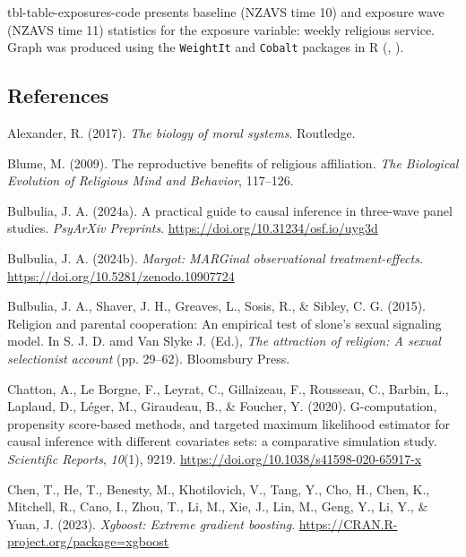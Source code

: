 \documentclass[
  single column]{article}
\newlength{\cslhangindent}
\newenvironment{CSLReferences}[2] %
 {\begin{list}{}{%
  \setlength{\itemindent}{0pt}
  \setlength{\leftmargin}{0pt}
  \setlength{\parsep}{0pt}
  \ifodd #1
   \setlength{\leftmargin}{\cslhangindent}
   \setlength{\itemindent}{-1\cslhangindent}
  \fi
  \setlength{\itemsep}{#2\baselineskip}}}
 {\end{list}}
\begin{document}
tbl-table-exposures-code presents baseline (NZAVS time 10) and exposure
wave (NZAVS time 11) statistics for the exposure variable: weekly
religious service. Graph was produced using the \texttt{WeightIt} and
\texttt{Cobalt} packages in R (, ).

\subsection*{References}\label{references}

\label{refs}
\begin{CSLReferences}{1}{0}
Alexander, R. (2017). \emph{The biology of moral systems}. Routledge.

Blume, M. (2009). The reproductive benefits of religious affiliation.
\emph{The Biological Evolution of Religious Mind and Behavior},
117--126.

Bulbulia, J. A. (2024a). A practical guide to causal inference in
three-wave panel studies. \emph{PsyArXiv Preprints}.
\url{https://doi.org/10.31234/osf.io/uyg3d}

Bulbulia, J. A. (2024b). \emph{Margot: MARGinal observational
treatment-effects}. \url{https://doi.org/10.5281/zenodo.10907724}

Bulbulia, J. A., Shaver, J. H., Greaves, L., Sosis, R., \& Sibley, C. G.
(2015). Religion and parental cooperation: An empirical test of slone's
sexual signaling model. In S. J. D. amd Van Slyke J. (Ed.), \emph{The
attraction of religion: A sexual selectionist account} (pp. 29--62).
Bloomsbury Press.

Chatton, A., Le Borgne, F., Leyrat, C., Gillaizeau, F., Rousseau, C.,
Barbin, L., Laplaud, D., Léger, M., Giraudeau, B., \& Foucher, Y.
(2020). G-computation, propensity score-based methods, and targeted
maximum likelihood estimator for causal inference with different
covariates sets: a comparative simulation study. \emph{Scientific
Reports}, \emph{10}(1), 9219.
\url{https://doi.org/10.1038/s41598-020-65917-x}

Chen, T., He, T., Benesty, M., Khotilovich, V., Tang, Y., Cho, H., Chen,
K., Mitchell, R., Cano, I., Zhou, T., Li, M., Xie, J., Lin, M., Geng,
Y., Li, Y., \& Yuan, J. (2023). \emph{Xgboost: Extreme gradient
boosting}. \url{https://CRAN.R-project.org/package=xgboost}


\end{CSLReferences}
\end{document}
